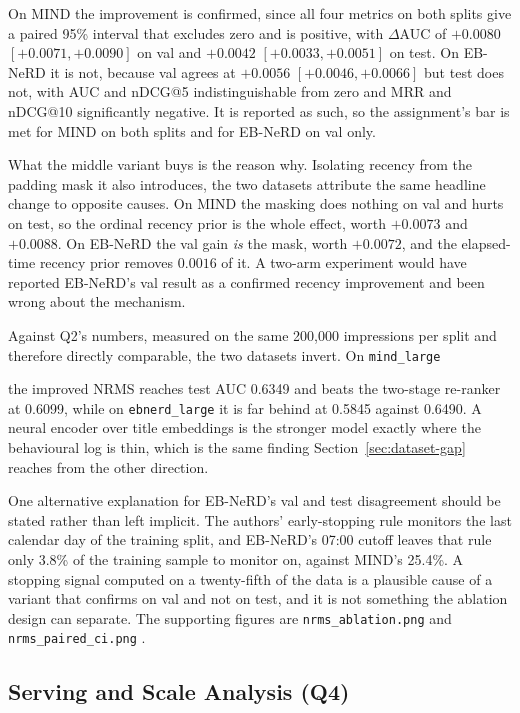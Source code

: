\documentclass[11pt]{article}
\newcommand{\code}[1]{%
    \colorbox{gray!40}{\texttt{#1}}%
}
\begin{document}
On MIND the improvement is confirmed, since all four metrics on both splits
give a paired 95\% interval that excludes zero and is positive, with
$\Delta$AUC of $+0.0080$ $[+0.0071, +0.0090]$ on val and $+0.0042$ $[+0.0033,
+0.0051]$ on test. On EB-NeRD it is not, because val agrees at $+0.0056$
$[+0.0046, +0.0066]$ but test does not, with AUC and nDCG@5 indistinguishable
from zero and MRR and nDCG@10 significantly negative. It is reported as such,
so the assignment's bar is met for MIND on both splits and for EB-NeRD on val
only.

What the middle variant buys is the reason why. Isolating recency from the
padding mask it also introduces, the two datasets attribute the same headline
change to opposite causes. On MIND the masking does nothing on val and hurts
on test, so the ordinal recency prior is the whole effect, worth $+0.0073$ and
$+0.0088$. On EB-NeRD the val gain \emph{is} the mask, worth $+0.0072$, and
the elapsed-time recency prior removes $0.0016$ of it. A two-arm experiment
would have reported EB-NeRD's val result as a confirmed recency improvement
and been wrong about the mechanism.

Against Q2's numbers, measured on the same 200,000 impressions per split and
therefore directly comparable, the two datasets invert. On \code{mind\_large}
the improved NRMS reaches test AUC 0.6349 and beats the two-stage re-ranker at
0.6099, while on \code{ebnerd\_large} it is far behind at 0.5845 against
0.6490. A neural encoder over title embeddings is the stronger model exactly
where the behavioural log is thin, which is the same finding
Section~\ref{sec:dataset-gap} reaches from the other direction.

One alternative explanation for EB-NeRD's val and test disagreement should be
stated rather than left implicit. The authors' early-stopping rule monitors
the last calendar day of the training split, and EB-NeRD's 07:00 cutoff leaves
that rule only 3.8\% of the training sample to monitor on, against MIND's
25.4\%. A stopping signal computed on a twenty-fifth of the data is a
plausible cause of a variant that confirms on val and not on test, and it is
not something the ablation design can separate. The supporting figures are
\code{nrms\_ablation.png} and \code{nrms\_paired\_ci.png}.

\subsection{Serving and Scale Analysis (Q4)}
\label{sec:serving}
\end{document}
